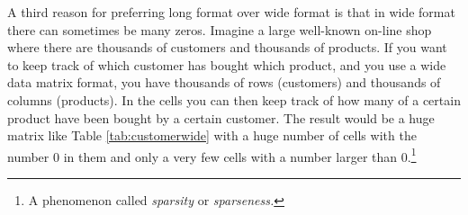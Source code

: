 %
%
%
%
%

A third reason for preferring long format over wide format is that in wide format there can sometimes be many zeros. Imagine a large well-known on-line shop where there are thousands of customers and thousands of products. If you want to keep track of which customer has bought which product, and you use a wide data matrix format, you have thousands of rows (customers) and thousands of columns (products). In the cells you can then keep track of how many of a certain product have been bought by a certain customer. The result would be a huge matrix like Table \ref{tab:customerwide} with a huge number of cells with the number 0 in them and only a very few cells with a number larger than 0.\footnote{A phenomenon called \textit{sparsity} or \textit{sparseness.}}

